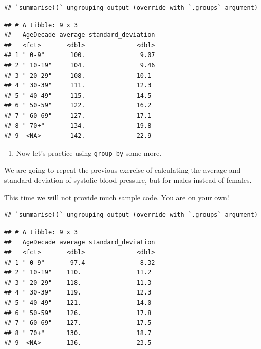 \documentclass[
]{article}
\newenvironment{Shaded}{\begin{snugshade}}{\end{snugshade}}
\newcommand{\DataTypeTok}[1]{\textcolor[rgb]{0.13,0.29,0.53}{#1}}
\newcommand{\KeywordTok}[1]{\textcolor[rgb]{0.13,0.29,0.53}{\textbf{#1}}}
\newcommand{\NormalTok}[1]{#1}
\newcommand{\OperatorTok}[1]{\textcolor[rgb]{0.81,0.36,0.00}{\textbf{#1}}}
\newcommand{\OtherTok}[1]{\textcolor[rgb]{0.56,0.35,0.01}{#1}}
\newcommand{\StringTok}[1]{\textcolor[rgb]{0.31,0.60,0.02}{#1}}
\providecommand{\tightlist}{%
  \setlength{\itemsep}{0pt}\setlength{\parskip}{0pt}}
\begin{document}
\begin{verbatim}
## `summarise()` ungrouping output (override with `.groups` argument)
\end{verbatim}

\begin{verbatim}
## # A tibble: 9 x 3
##   AgeDecade average standard_deviation
##   <fct>       <dbl>              <dbl>
## 1 " 0-9"       100.               9.07
## 2 " 10-19"     104.               9.46
## 3 " 20-29"     108.              10.1 
## 4 " 30-39"     111.              12.3 
## 5 " 40-49"     115.              14.5 
## 6 " 50-59"     122.              16.2 
## 7 " 60-69"     127.              17.1 
## 8 " 70+"       134.              19.8 
## 9  <NA>        142.              22.9
\end{verbatim}

\begin{enumerate}
\def\labelenumi{\arabic{enumi}.}
\setcounter{enumi}{5}
\tightlist
\item
  Now let's practice using \texttt{group\_by} some more.
\end{enumerate}

We are going to repeat the previous exercise of calculating the average
and standard deviation of systolic blood pressure, but for males instead
of females.

This time we will not provide much sample code. You are on your own!

\begin{Shaded}
\end{Shaded}

\begin{verbatim}
## `summarise()` ungrouping output (override with `.groups` argument)
\end{verbatim}

\begin{verbatim}
## # A tibble: 9 x 3
##   AgeDecade average standard_deviation
##   <fct>       <dbl>              <dbl>
## 1 " 0-9"       97.4               8.32
## 2 " 10-19"    110.               11.2 
## 3 " 20-29"    118.               11.3 
## 4 " 30-39"    119.               12.3 
## 5 " 40-49"    121.               14.0 
## 6 " 50-59"    126.               17.8 
## 7 " 60-69"    127.               17.5 
## 8 " 70+"      130.               18.7 
## 9  <NA>       136.               23.5
\end{verbatim}
\end{document}
